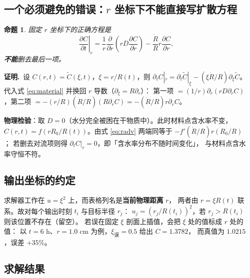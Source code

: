 \documentclass[withoutpreface,bwprint]{cumcmthesis}
\newtheorem{proposition}{命题}
\begin{document}
\subsection{一个必须避免的错误：$r$ 坐标下不能直接写扩散方程}

\begin{proposition}
固定 $r$ 坐标下的正确方程是
\begin{equation}
\left.\frac{\partial C}{\partial t}\right|_r
=\frac{1}{r}\frac{\partial}{\partial r}\left(rD\frac{\partial C}{\partial r}\right)
-\frac{\dot R}{R}r\frac{\partial C}{\partial r},
\label{eq:radv}
\end{equation}
\textbf{不能}删去最后一项。
\end{proposition}
\noindent\textbf{证明.}\ 
设 $C(r,t)=\tilde C(\xi,t)$，$\xi=r/R(t)$，则
$\partial_tC|_r=\partial_t\tilde C|_\xi-(\xi\dot R/R)\partial_\xi\tilde C$。
代入式 \eqref{eq:material} 并换回 $r$ 导数（$\partial_\xi=R\partial_r$）：
第一项 $=(1/r)\partial_r(rD\partial_rC)$，第二项
$=-(r/R)(\dot R/R)(R\partial_rC)=-(\dot R/R)r\partial_rC$。

\textbf{物理检验}：取 $D=0$（水分完全被困在干物质中）。此时材料点含水率不变，
$C(r,t)=f(rR_0/R(t))$。由式 \eqref{eq:radv} 两端同等于 $-f'(\dot R/R)r(R_0/R)$；
若删去对流项则得 $\partial_tC|_r=0$，即「含水率分布不随时间变化」，
与材料点含水率守恒不符。

\subsection{输出坐标的约定}

求解器工作在 $u=\xi^2$ 上，而表格列名是\textbf{当前物理距离} $r$，
两者由 $r=\xi R(t)$ 联系。故对每个输出时刻 $t_i$ 与目标半径 $r_j$：
$u_j=(r_j/R(t_i))^2$，若 $r_j>R(t_i)$ 则该位置不存在（留空）。
若误在固定 $\xi$ 剖面上插值，会把 $\xi$ 处的值标成 $r$ 处的值：
以 $t=6$ h、$r=1.0$ cm 为例，$\xi_{\text{误}}=0.5$ 给出 $C=1.3782$，
而真值为 $1.0215$，误差 $+35\%$。

\subsection{求解结果}
\end{document}
